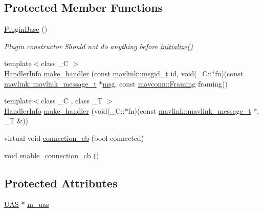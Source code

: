 \subsection*{Protected Member Functions}
\begin{DoxyCompactItemize}
\item 
\mbox{\hyperlink{group__plugin_gac37e1a835763608688df9b6b6806917b}{Plugin\+Base}} ()
\begin{DoxyCompactList}\small\item\em Plugin constructor Should not do anything before \mbox{\hyperlink{group__plugin_gad5313a41da4d26acbbabf008cdc21e82}{initialize()}} \end{DoxyCompactList}\item 
{\footnotesize template$<$class \+\_\+C $>$ }\\\mbox{\hyperlink{group__plugin_gab973eb02b8f26a7b2b9cea37924317f1}{Handler\+Info}} \mbox{\hyperlink{group__plugin_gac7d70e0432c00220da41948757a35a50}{make\+\_\+handler}} (const \mbox{\hyperlink{namespacemavlink_a98a1fe49b380ed1ea252d2c13bf3278d}{mavlink\+::msgid\+\_\+t}} id, void(\+\_\+\+C\+::$\ast$fn)(const \mbox{\hyperlink{include__v0_89_2mavlink__types_8h_a63b963764c09dc72f4910c1521e325b9}{mavlink\+::mavlink\+\_\+message\+\_\+t}} $\ast$\mbox{\hyperlink{stratnode_8cpp_a82cfe4ed9bc9e1b07c8bf209c324d85b}{msg}}, const \mbox{\hyperlink{group__mavconn_gac93e6f8262bcc6008b4882ae6213f494}{mavconn\+::\+Framing}} framing))
\item 
{\footnotesize template$<$class \+\_\+C , class \+\_\+T $>$ }\\\mbox{\hyperlink{group__plugin_gab973eb02b8f26a7b2b9cea37924317f1}{Handler\+Info}} \mbox{\hyperlink{group__plugin_ga04a415508e82a7cc8ec15ce8a04eac5e}{make\+\_\+handler}} (void(\+\_\+\+C\+::$\ast$fn)(const \mbox{\hyperlink{include__v0_89_2mavlink__types_8h_a63b963764c09dc72f4910c1521e325b9}{mavlink\+::mavlink\+\_\+message\+\_\+t}} $\ast$, \+\_\+T \&))
\item 
virtual void \mbox{\hyperlink{group__plugin_gadad2eaef432d01ad059a6edb40ab8443}{connection\+\_\+cb}} (bool connected)
\item 
void \mbox{\hyperlink{group__plugin_ga7b437229a6cd8d15a1a5c5aaff31683e}{enable\+\_\+connection\+\_\+cb}} ()
\end{DoxyCompactItemize}
\subsection*{Protected Attributes}
\begin{DoxyCompactItemize}
\item 
\mbox{\hyperlink{classmavros_1_1UAS}{U\+AS}} $\ast$ \mbox{\hyperlink{group__plugin_ga198ba0390b8d70025bfb7f9467ae3057}{m\+\_\+uas}}
\end{DoxyCompactItemize}


